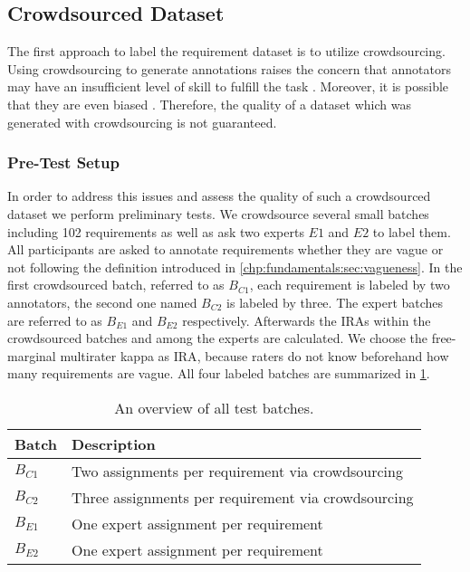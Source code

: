 \subsection{Crowdsourced Dataset}
\label{chp:study:sec:study_objects:crowdsourced_dataset}

The first approach to label the requirement dataset is to utilize crowdsourcing.
Using crowdsourcing to generate annotations raises the concern that annotators may have an insufficient level of skill to fulfill the task \parencite{Quinn:2011}.
Moreover, it is possible that they are even biased \parencite{Kittur:2008}.
Therefore, the quality of a dataset which was generated with crowdsourcing is not guaranteed.

\subsubsection{Pre-Test Setup}
In order to address this issues and assess the quality of such a crowdsourced dataset we perform preliminary tests.
We crowdsource several small batches including 102 requirements as well as ask two experts $E1$ and $E2$ to label them.
All participants are asked to annotate requirements whether they are vague or not following the definition introduced in \cref{chp:fundamentals:sec:vagueness}.
In the first crowdsourced batch, referred to as $B_{C1}$, each requirement is labeled by two annotators, the second one named $B_{C2}$ is labeled by three.
The expert batches are referred to as $B_{E1}$ and $B_{E2}$ respectively.
Afterwards the \acp{IRA} within the crowdsourced batches and among the experts are calculated.
We choose the free-marginal multirater kappa as \ac{IRA}, because raters do not know beforehand how many requirements are vague.
All four labeled batches are summarized in \cref{tab:study:objects:crowdsourcing:batches}.
\begin{table}[htpb]
    \centering
    \begin{tabular}{l l}
        \toprule
        Batch & Description \\
        \midrule
        $B_{C1}$ & Two assignments per requirement via crowdsourcing\\
        $B_{C2}$ & Three assignments per requirement via crowdsourcing\\
        $B_{E1}$ & One expert assignment per requirement \\
        $B_{E2}$ & One expert assignment per requirement \\
        \bottomrule
    \end{tabular}
    \caption[Overview of test batches]{An overview of all test batches.}\label{tab:study:objects:crowdsourcing:batches}
\end{table}

